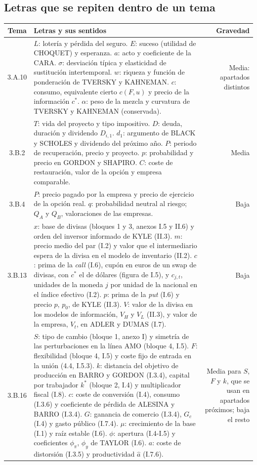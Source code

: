 \documentclass[10pt,a4paper]{article}
\begin{document}
\subsection*{Letras que se repiten dentro de un tema}
\begin{longtable}{SMD}
\toprule\textbf{Tema} & \textbf{Letras y sus sentidos} & \textbf{Gravedad}\\\midrule\endhead\bottomrule\endfoot
3.A.10 & $L$: lotería y pérdida del seguro. $E$: suceso (utilidad de CHOQUET) y esperanza. $a$: acto y coeficiente de la CARA. $\sigma$: desviación típica y elasticidad de sustitución intertemporal. $w$: riqueza y función de ponderación de TVERSKY y KAHNEMAN. $c$: consumo, equivalente cierto $c(F,u)$ y precio de la información $c^*$. $\alpha$: peso de la mezcla y curvatura de TVERSKY y KAHNEMAN (conservada). & Media: apartados distintos\\
3.B.2 & $T$: vida del proyecto y tipo impositivo. $D$: deuda, duración y dividendo $D_{i,1}$. $d_1$: argumento de BLACK y SCHOLES y dividendo del próximo año. $P$: periodo de recuperación, precio y proyecto. $p$: probabilidad y precio en GORDON y SHAPIRO. $C$: coste de restauración, valor de la opción y empresa comparable. & Media\\
3.B.4 & $P$: precio pagado por la empresa y precio de ejercicio de la opción real. $q$: probabilidad neutral al riesgo; $Q_A$ y $Q_B$, valoraciones de las empresas. & Baja\\
3.B.13 & $x$: base de divisas (bloques 1 y 3, anexos I.5 y II.6) y orden del inversor informado de KYLE (II.3). $m$: precio medio del par (I.2) y valor que el intermediario espera de la divisa en el modelo de inventario (II.2). $c$: prima de la \textit{call} (I.6), cupón en euros de un swap de divisas, con $c^*$ el de dólares (figura de I.5), y $c_{j,t}$, unidades de la moneda $j$ por unidad de la nacional en el índice efectivo (I.2). $p$: prima de la \textit{put} (I.6) y precio $p$, $p_0$, de KYLE (II.3). $V$: valor de la divisa en los modelos de información, $V_H$ y $V_L$ (II.3), y valor de la empresa, $V_t$, en ADLER y DUMAS (I.7). & Baja\\
3.B.16 & $S$: tipo de cambio (bloque 1, anexo I) y simetría de las perturbaciones en la línea AMO (bloque 4, I.5). $F$: flexibilidad (bloque 4, I.5) y coste fijo de entrada en la unión (4.4, I.5.3). $k$: distancia del objetivo de producción en BARRO y GORDON (I.3.4), capital por trabajador $k^*$ (bloque 2, I.4) y multiplicador fiscal (I.8). $c$: coste de conversión (I.4), consumo (I.3.6) y coeficiente de pérdida de ALESINA y BARRO (I.3.4). $G$: ganancia de comercio (I.3.4), $G_c$ (I.4) y gasto público (I.7.4). $\mu$: crecimiento de la base (I.1) y raíz estable (I.6). $\phi$: apertura (I.4-I.5) y coeficientes $\phi_\pi$, $\phi_y$ de TAYLOR (I.6). $a$: coste de distorsión (I.3.5) y productividad $\hat a$ (I.7.6). & Media para $S$, $F$ y $k$, que se usan en apartados próximos; baja el resto\\

\end{longtable}
\end{document}
